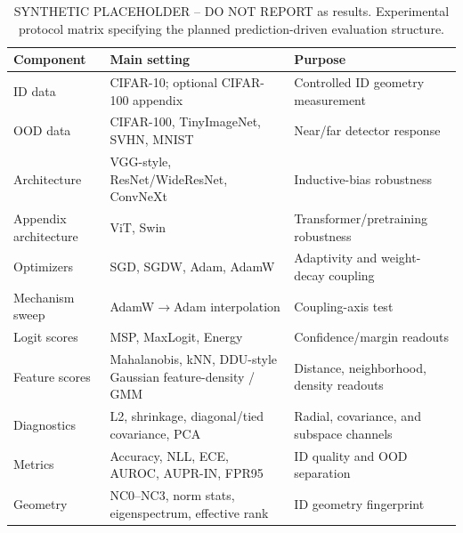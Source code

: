 \begin{table}[t]
\caption{SYNTHETIC PLACEHOLDER -- DO NOT REPORT as results. Experimental
protocol matrix specifying the planned prediction-driven evaluation structure.}
\label{tab:exp-protocol-matrix}
\begin{center}
\footnotesize
\setlength{\tabcolsep}{4pt}
\renewcommand{\arraystretch}{1.15}
\begin{tabular}{@{}p{}p{}p{}@{}}
\toprule
Component & Main setting & Purpose \\
\midrule
ID data & CIFAR-10; optional CIFAR-100 appendix & Controlled ID geometry measurement \\
OOD data & CIFAR-100, TinyImageNet, SVHN, MNIST & Near/far detector response \\
Architecture & VGG-style, ResNet/WideResNet, ConvNeXt & Inductive-bias robustness \\
Appendix architecture & ViT, Swin & Transformer/pretraining robustness \\
Optimizers & SGD, SGDW, Adam, AdamW & Adaptivity and weight-decay coupling \\
Mechanism sweep & AdamW\(\rightarrow\)Adam interpolation & Coupling-axis test \\
Logit scores & MSP, MaxLogit, Energy & Confidence/margin readouts \\
Feature scores & Mahalanobis, kNN, DDU-style Gaussian feature-density / GMM & Distance, neighborhood, density readouts \\
Diagnostics & L2, shrinkage, diagonal/tied covariance, PCA & Radial, covariance, and subspace channels \\
Metrics & Accuracy, NLL, ECE, AUROC, AUPR-IN, FPR95 & ID quality and OOD separation \\
Geometry & NC0--NC3, norm stats, eigenspectrum, effective rank & ID geometry fingerprint \\
\bottomrule
\end{tabular}
\end{center}
\end{table}
